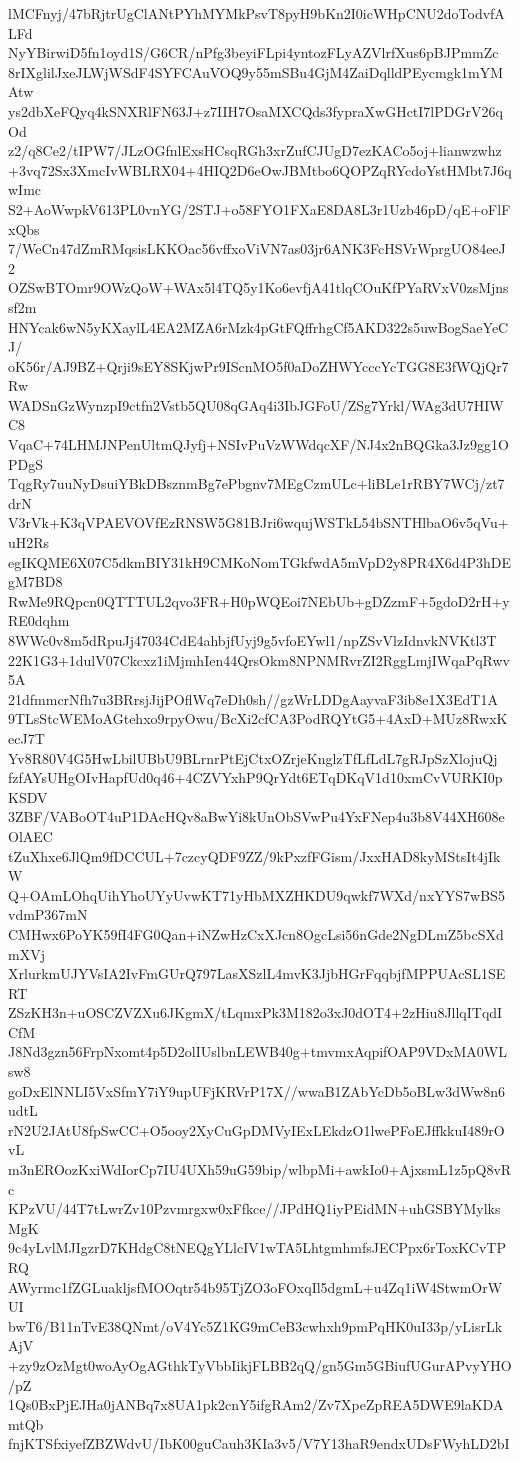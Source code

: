 lMCFnyj/47bRjtrUgClANtPYhMYMkPsvT8pyH9bKn2I0icWHpCNU2doTodvfALFd
NyYBirwiD5fn1oyd1S/G6CR/nPfg3beyiFLpi4yntozFLyAZVlrfXus6pBJPmmZc
8rIXglilJxeJLWjWSdF4SYFCAuVOQ9y55mSBu4GjM4ZaiDqlldPEycmgk1mYMAtw
ys2dbXeFQyq4kSNXRlFN63J+z7IIH7OsaMXCQds3fypraXwGHctI7lPDGrV26qOd
z2/q8Ce2/tIPW7/JLzOGfnlExsHCsqRGh3xrZufCJUgD7ezKACo5oj+lianwzwhz
+3vq72Sx3XmcIvWBLRX04+4HIQ2D6eOwJBMtbo6QOPZqRYcdoYstHMbt7J6qwImc
S2+AoWwpkV613PL0vnYG/2STJ+o58FYO1FXaE8DA8L3r1Uzb46pD/qE+oFlFxQbs
7/WeCn47dZmRMqsisLKKOac56vffxoViVN7as03jr6ANK3FcHSVrWprgUO84eeJ2
OZSwBTOmr9OWzQoW+WAx5l4TQ5y1Ko6evfjA41tlqCOuKfPYaRVxV0zsMjnssf2m
HNYcak6wN5yKXaylL4EA2MZA6rMzk4pGtFQffrhgCf5AKD322s5uwBogSaeYeCJ/
oK56r/AJ9BZ+Qrji9sEY8SKjwPr9IScnMO5f0aDoZHWYcccYcTGG8E3fWQjQr7Rw
WADSnGzWynzpI9ctfn2Vstb5QU08qGAq4i3IbJGFoU/ZSg7Yrkl/WAg3dU7HIWC8
VqaC+74LHMJNPenUltmQJyfj+NSIvPuVzWWdqcXF/NJ4x2nBQGka3Jz9gg1OPDgS
TqgRy7uuNyDsuiYBkDBsznmBg7ePbgnv7MEgCzmULc+liBLe1rRBY7WCj/zt7drN
V3rVk+K3qVPAEVOVfEzRNSW5G81BJri6wqujWSTkL54bSNTHlbaO6v5qVu+uH2Rs
egIKQME6X07C5dkmBIY31kH9CMKoNomTGkfwdA5mVpD2y8PR4X6d4P3hDEgM7BD8
RwMe9RQpcn0QTTTUL2qvo3FR+H0pWQEoi7NEbUb+gDZzmF+5gdoD2rH+yRE0dqhm
8WWc0v8m5dRpuJj47034CdE4ahbjfUyj9g5vfoEYwl1/npZSvVlzIdnvkNVKtl3T
22K1G3+1dulV07Ckcxz1iMjmhIen44QrsOkm8NPNMRvrZI2RggLmjIWqaPqRwv5A
21dfmmcrNfh7u3BRrsjJijPOflWq7eDh0sh//gzWrLDDgAayvaF3ib8e1X3EdT1A
9TLsStcWEMoAGtehxo9rpyOwu/BcXi2cfCA3PodRQYtG5+4AxD+MUz8RwxKecJ7T
Yv8R80V4G5HwLbilUBbU9BLrnrPtEjCtxOZrjeKnglzTfLfLdL7gRJpSzXlojuQj
fzfAYsUHgOIvHapfUd0q46+4CZVYxhP9QrYdt6ETqDKqV1d10xmCvVURKI0pKSDV
3ZBF/VABoOT4uP1DAcHQv8aBwYi8kUnObSVwPu4YxFNep4u3b8V44XH608eOlAEC
tZuXhxe6JlQm9fDCCUL+7czcyQDF9ZZ/9kPxzfFGism/JxxHAD8kyMStsIt4jIkW
Q+OAmLOhqUihYhoUYyUvwKT71yHbMXZHKDU9qwkf7WXd/nxYYS7wBS5vdmP367mN
CMHwx6PoYK59fI4FG0Qan+iNZwHzCxXJcn8OgcLsi56nGde2NgDLmZ5bcSXdmXVj
XrlurkmUJYVsIA2IvFmGUrQ797LasXSzlL4mvK3JjbHGrFqqbjfMPPUAcSL1SERT
ZSzKH3n+uOSCZVZXu6JKgmX/tLqmxPk3M182o3xJ0dOT4+2zHiu8JllqITqdICfM
J8Nd3gzn56FrpNxomt4p5D2olIUslbnLEWB40g+tmvmxAqpifOAP9VDxMA0WLsw8
goDxElNNLI5VxSfmY7iY9upUFjKRVrP17X//wwaB1ZAbYcDb5oBLw3dWw8n6udtL
rN2U2JAtU8fpSwCC+O5ooy2XyCuGpDMVyIExLEkdzO1lwePFoEJffkkuI489rOvL
m3nEROozKxiWdIorCp7IU4UXh59uG59bip/wlbpMi+awkIo0+AjxsmL1z5pQ8vRc
KPzVU/44T7tLwrZv10Pzvmrgxw0xFfkce//JPdHQ1iyPEidMN+uhGSBYMylksMgK
9c4yLvlMJIgzrD7KHdgC8tNEQgYLlcIV1wTA5LhtgmhmfsJECPpx6rToxKCvTPRQ
AWyrmc1fZGLuakljsfMOOqtr54b95TjZO3oFOxqIl5dgmL+u4Zq1iW4StwmOrWUI
bwT6/B11nTvE38QNmt/oV4Yc5Z1KG9mCeB3cwhxh9pmPqHK0uI33p/yLisrLkAjV
+zy9zOzMgt0woAyOgAGthkTyVbbIikjFLBB2qQ/gn5Gm5GBiufUGurAPvyYHO/pZ
1Qs0BxPjEJHa0jANBq7x8UA1pk2cnY5ifgRAm2/Zv7XpeZpREA5DWE9laKDAmtQb
fnjKTSfxiyefZBZWdvU/IbK00guCauh3KIa3v5/V7Y13haR9endxUDsFWyhLD2bI
